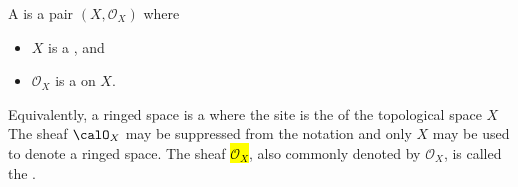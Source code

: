 \begin{definition} \label{definition:ringed_space}
    A  is a pair $(X, \mathcal{O}_X)$ where
    \begin{itemize}
        \item $X$ is a , and
        \item $\mathcal{O}_X$ is a   on $X$.
    \end{itemize}
    Equivalently, a ringed space is a  where the site is the  of the topological space $X$
    The sheaf $\calO_X$ may be suppressed from the notation and only $X$ may be used to denote a ringed space. The sheaf \hl{$\mathcal{O}_X$}, also commonly denoted by $\mathscr{O}_X$, is called the .
\end{definition}

